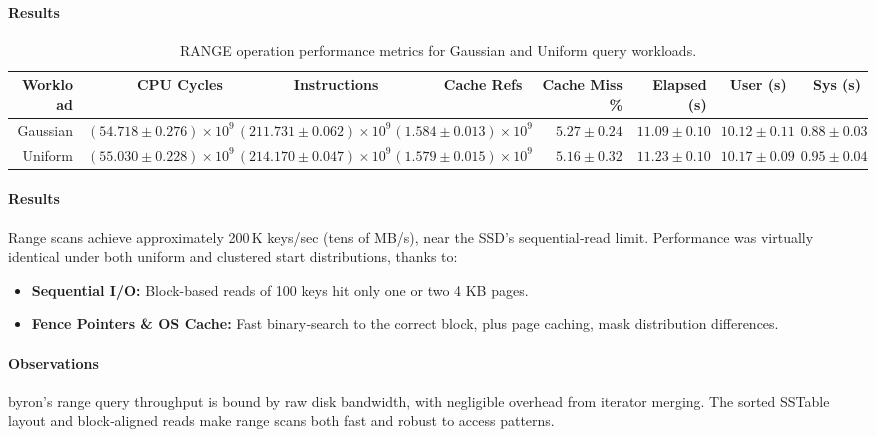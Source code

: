 \documentclass[10pt]{article}
\begin{document}
\paragraph{Results}
\begin{table}[htbp]
  \centering
  \small
  \begin{tabular}{r r r r r r r r}
    \toprule
    Workload   & CPU Cycles                        & Instructions                         & Cache Refs                       & Cache Miss \% & Elapsed (s)     & User (s)        & Sys (s)         \\
    \midrule
    Gaussian   & $(54.718\pm0.276)\times10^{9}$    & $(211.731\pm0.062)\times10^{9}$      & $(1.584\pm0.013)\times10^{9}$    & $5.27\pm0.24$ & $11.09\pm0.10$  & $10.12\pm0.11$  & $0.88\pm0.03$   \\
    Uniform    & $(55.030\pm0.228)\times10^{9}$    & $(214.170\pm0.047)\times10^{9}$      & $(1.579\pm0.015)\times10^{9}$    & $5.16\pm0.32$ & $11.23\pm0.10$  & $10.17\pm0.09$  & $0.95\pm0.04$   \\
    \bottomrule
  \end{tabular}
  \caption{RANGE operation performance metrics for Gaussian and Uniform query workloads.}
  \label{tab:range_perf_full}
\end{table}

\paragraph{Results}
Range scans achieve approximately 200\,K keys/sec (tens of MB/s), near the SSD’s sequential‐read limit. Performance was virtually identical under both uniform and clustered start distributions, thanks to:

\begin{itemize}[itemsep=0.5ex]
  \item \textbf{Sequential I/O:} Block-based reads of 100 keys hit only one or two 4 KB pages.
  \item \textbf{Fence Pointers \& OS Cache:} Fast binary‐search to the correct block, plus page caching, mask distribution differences.
\end{itemize}

\paragraph{Observations}
byron’s range query throughput is bound by raw disk bandwidth, with negligible overhead from iterator merging. The sorted SSTable layout and block‐aligned reads make range scans both fast and robust to access patterns.
\end{document}
